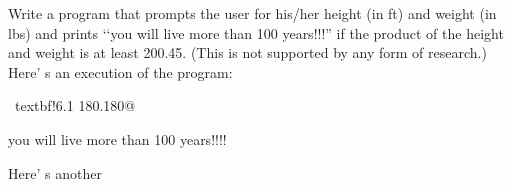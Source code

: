 Write a program that prompts the user for his/her height (in ft) and weight (in lbs) and prints \lq\lq you will live more than 100 years!!!'' if the product of the height and weight is at least 200.45. (This is not supported by any form of research.) Here' s an execution of the program:

\begin{console}[commandchars=\~\!\@]

~textbf!6.1 180.180@

\end{console}

\begin{console}

you will live more than 100 years!!!!

\end{console}

Here' s another



